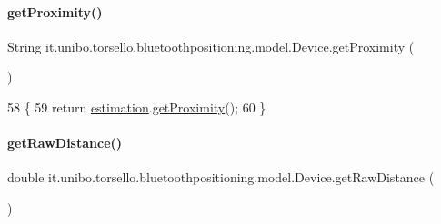 \paragraph{\texorpdfstring{get\+Proximity()}{getProximity()}}
{\footnotesize\ttfamily String it.\+unibo.\+torsello.\+bluetoothpositioning.\+model.\+Device.\+get\+Proximity (\begin{DoxyParamCaption}{ }\end{DoxyParamCaption})}


\begin{DoxyCode}
58                                  \{
59         \textcolor{keywordflow}{return} \hyperlink{classit_1_1unibo_1_1torsello_1_1bluetoothpositioning_1_1model_1_1Device_ac619c42728cd40f41a5f12fde56b4425_ac619c42728cd40f41a5f12fde56b4425}{estimation}.\hyperlink{classit_1_1unibo_1_1torsello_1_1bluetoothpositioning_1_1distanceEstimation_1_1Estimation_a2edfb9f301730647277474c61b41dbd5_a2edfb9f301730647277474c61b41dbd5}{getProximity}();
60     \}
\end{DoxyCode}
\hypertarget{classit_1_1unibo_1_1torsello_1_1bluetoothpositioning_1_1model_1_1Device_abd5c0c1d478ac01c009959891456bbb8_abd5c0c1d478ac01c009959891456bbb8}{}\label{classit_1_1unibo_1_1torsello_1_1bluetoothpositioning_1_1model_1_1Device_abd5c0c1d478ac01c009959891456bbb8_abd5c0c1d478ac01c009959891456bbb8} 
\paragraph{\texorpdfstring{get\+Raw\+Distance()}{getRawDistance()}}
{\footnotesize\ttfamily double it.\+unibo.\+torsello.\+bluetoothpositioning.\+model.\+Device.\+get\+Raw\+Distance (\begin{DoxyParamCaption}{ }\end{DoxyParamCaption})}


